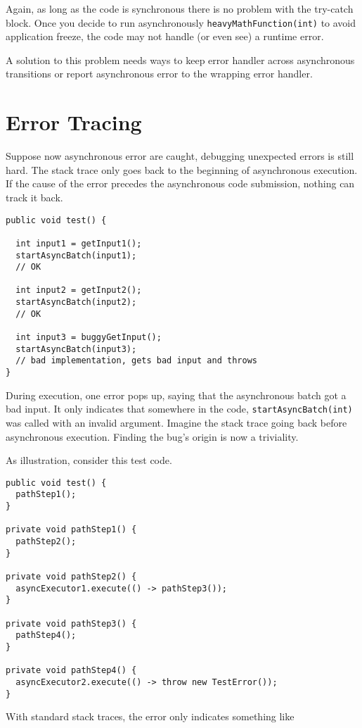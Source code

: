 Again, as long as the code is synchronous there is no problem with the try-catch block. Once you decide to run asynchronously \lstinline{heavyMathFunction(int)} to avoid application freeze, the code may not handle (or even see) a runtime error.

A solution to this problem needs ways to keep error handler across asynchronous transitions or report asynchronous error to the wrapping error handler.

\section{Error Tracing}

Suppose now asynchronous error are caught, debugging unexpected errors is still hard. The stack trace only goes back to the beginning of asynchronous execution. If the cause of the error precedes the asynchronous code submission, nothing can track it back.

\begin{lstlisting}
public void test() {

  int input1 = getInput1();
  startAsyncBatch(input1);
  // OK

  int input2 = getInput2();
  startAsyncBatch(input2);
  // OK

  int input3 = buggyGetInput();
  startAsyncBatch(input3);
  // bad implementation, gets bad input and throws
}
\end{lstlisting}

During execution, one error pops up, saying that the asynchronous batch got a bad input. It only indicates that somewhere in the code, \lstinline{startAsyncBatch(int)} was called with an invalid argument. Imagine the stack trace going back before asynchronous execution. Finding the bug's origin is now a triviality. 

As illustration, consider this test code.

\begin{lstlisting}
public void test() {
  pathStep1();
}

private void pathStep1() {
  pathStep2();
}

private void pathStep2() {
  asyncExecutor1.execute(() -> pathStep3());
}

private void pathStep3() {
  pathStep4();
}

private void pathStep4() {
  asyncExecutor2.execute(() -> throw new TestError());
}
\end{lstlisting}

With standard stack traces, the error only indicates something like


